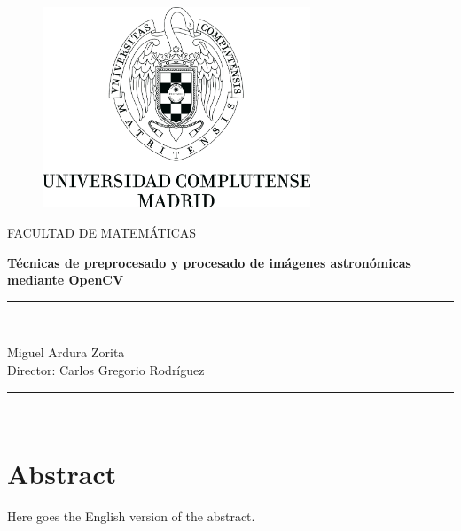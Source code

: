 \documentclass[a4paper,12pt]{article}
\begin{document}
\lstset{inputencoding=utf8/latin1}
\renewcommand{\figurename}{Figura}
\begin{titlepage}
\begin{center}
\begin{figure}
\begin{center}
\includegraphics[width=8cm]{logo.jpg}
\end{center}
\end{figure}
FACULTAD DE MATEMÁTICAS\\
\vspace{0.2in}
\begin{Large}
\textbf{Técnicas de preprocesado y procesado de imágenes astronómicas mediante OpenCV}
\end{Large}
\rule{80mm}{0.1mm}\\
\begin{large}
Miguel Ardura Zorita\\
Director: Carlos Gregorio Rodríguez
\end{large}
\vspace*{0.3in}
\rule{80mm}{0.1mm}\\
\vspace*{0.1in}

\end{center}

\end{titlepage}

\newpage
\section*{Abstract}
Here goes the English version of the abstract.
\\
\newpage
\renewcommand\contentsname{Índice general}
\tableofcontents
\newpage
\end{document}
